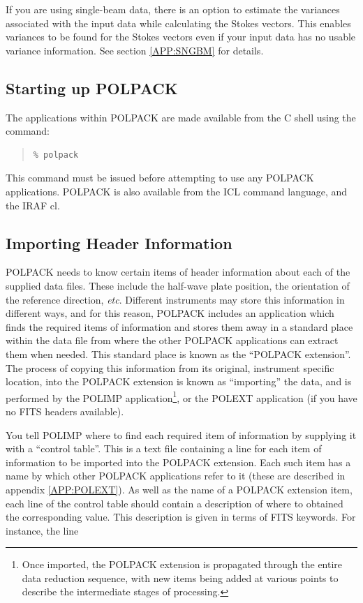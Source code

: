 \documentclass[twoside,11pt]{article}
\newcommand{\hyperref}[4]{#2\ref{#4}#3}
\newcommand{\htmlref}[2]{#1}
\newcommand{\xref}[3]{#1}
\newcommand{\xlabel}[1]{}
\renewcommand{\_}{\texttt{\symbol{95}}}
\newenvironment{myquote}{\begin{quote}\begin{small}}{\end{small}\end{quote}}
\begin{document}
If you are using single-beam data, there is an option to estimate the 
variances associated with the input data while calculating the Stokes 
vectors.
This enables variances to be found for the Stokes vectors even if your 
input data has no usable variance information. \hyperref{Go here}{See section }
{}{APP:SNGBM} for details.

\subsection{\label{SEC:START}\xlabel{startup}Starting up POLPACK}

The applications within POLPACK are made available from the C shell using the 
command:
\begin{myquote}
\begin{verbatim}
% polpack
\end{verbatim}
\end{myquote}

This command must be issued before attempting to use any POLPACK
applications. POLPACK is also available from the \xref{ICL}{sg5}{}
 command language, and the IRAF cl.

\subsection{\label{SEC:IMPORT}Importing Header Information}
POLPACK needs to know certain items of header information about each of
the supplied data files. These include the half-wave plate position, the
orientation of the reference direction, \emph{etc}. Different instruments may
store this information in different ways, and for this reason, POLPACK
includes an application which finds the required items of information and
stores them away in a standard place within the data file from where the
other POLPACK applications can extract them when needed. This standard
place is known as the ``POLPACK extension''. The process of copying this
information from its original, instrument specific location, into the
POLPACK extension is known as ``importing'' the data, and is performed by
the \htmlref{POLIMP}{POLIMP} application\footnote{Once imported, the POLPACK
extension is propagated through the entire data reduction sequence, with
new items being added at various points to describe the intermediate
stages of processing.}, or the \htmlref{POLEXT}{POLEXT} application (if
you have no FITS headers available).

You tell POLIMP where to find each required item of information by
supplying it with a ``control table''. This is a text file containing a
line for each item of information to be imported into the POLPACK
extension. Each such item has a name by which other POLPACK applications
refer to it (these are described \hyperref{here}{in
appendix }{}{APP:POLEXT}). As well as the name of a POLPACK extension
item, each line of the control table should contain a description of where to
obtained the corresponding value. This description is given in terms of
FITS keywords. For instance, the line
\end{document}
